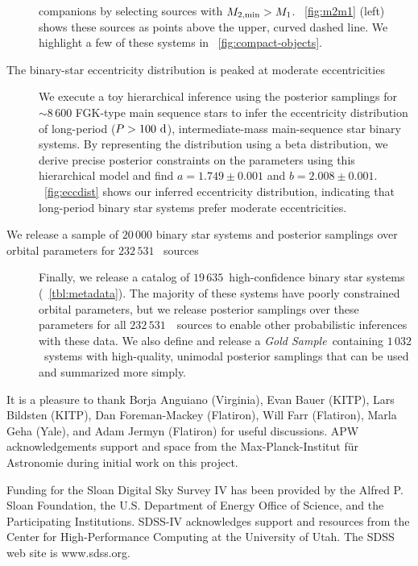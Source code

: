 \documentclass[modern]{aastex63}
\newcommand{\nsources}{\ensuremath{232\,531}}
\newcommand{\nbinary}{\ensuremath{19\,635}}
\newcommand{\goldsample}{\textit{Gold Sample}}
\newcommand{\ngold}{\ensuremath{1\,032}}
\begin{document}
\begin{description}
    companions by selecting sources with $M_{2, {\rm min}} > M_1$.
    \figurename~\ref{fig:m2m1} (left) shows these sources as points above the
    upper, curved dashed line. We highlight a few of these systems in
    \figurename~\ref{fig:compact-objects}.
    \item[The binary-star eccentricity distribution is peaked at
    moderate eccentricities] We execute a toy hierarchical inference using the
    posterior samplings for $\sim 8\,600$ FGK-type main sequence stars to infer
    the eccentricity distribution of long-period ($P>100~\mathrm{d}$),
    intermediate-mass main-sequence star binary systems. By representing the
    distribution using a beta distribution, we derive precise posterior
    constraints on the parameters using this hierarchical model and find $a =
    1.749 \pm 0.001$ and $b = 2.008 \pm 0.001$. \figurename~\ref{fig:eccdist}
    shows our inferred eccentricity distribution, indicating that long-period
    binary star systems prefer moderate eccentricities.
    \item[We release a sample of $20\,000$ binary star systems and posterior
    samplings over orbital parameters for $\nsources$ \apogee\ sources] Finally,
    we release a catalog of \nbinary\ high-confidence binary star systems
    (\tablename~\ref{tbl:metadata}). The majority of these systems have poorly
    constrained orbital parameters, but we release posterior samplings over
    these parameters for all \nsources\ \apogee\ sources to enable other
    probabilistic inferences with these data. We also define and release a
    \goldsample\ containing \ngold\ systems with high-quality, unimodal
    posterior samplings that can be used and summarized more simply.
\end{description}


\acknowledgements

It is a pleasure to thank
Borja Anguiano (Virginia),
Evan Bauer (KITP),
Lars Bildsten (KITP),
Dan Foreman-Mackey (Flatiron),
Will Farr (Flatiron),
Marla Geha (Yale),
and Adam Jermyn (Flatiron) for useful discussions.
APW acknowledgements support and space from the Max-Planck-Institut f\"ur
Astronomie during initial work on this project.

Funding for the Sloan Digital Sky Survey IV has been provided by the Alfred P.
Sloan Foundation, the U.S. Department of Energy Office of Science, and the
Participating Institutions. SDSS-IV acknowledges support and resources from the
Center for High-Performance Computing at the University of Utah. The SDSS web
site is www.sdss.org.
\end{document}
